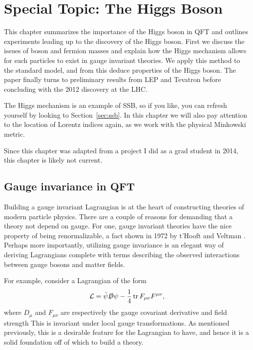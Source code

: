 \chapter{Special Topic: The Higgs Boson}\label{ap:spec_higgs}

This chapter summarizes the importance of the Higgs boson in QFT and outlines
experiments leading up to the discovery of the Higgs boson.
First we discuss the issues of boson and fermion masses and explain
how the Higgs mechanism allows for such particles to exist in gauge invariant
theories. We apply this method to the standard model, and from this deduce
properties of the Higgs boson. The paper finally turns to preliminary results 
from LEP and Tevatron before concluding with the 2012 discovery at the LHC.

The Higgs mechanism is an example of SSB, so if you like, you can refresh
yourself by looking to Section~\ref{sec:ssb}. In this chapter we will
also pay attention to the location of Lorentz indices again, as we
work with the physical Minkowski metric.

Since this chapter was adapted from a project I did as a grad student in 2014,
this chapter is likely not current.

\section{Gauge invariance in QFT}

Building a gauge invariant Lagrangian is at the heart of constructing theories
of modern particle physics. There are a couple of reasons for demanding that a
theory not depend on gauge. For one, gauge invariant theories have the nice
property of being renormalizable, a fact shown in 1972 by t'Hooft and Veltman 
\cite{t_hooft_regularization_1972}. Perhaps more importantly, utilizing gauge
invariance is an elegant way of deriving Lagrangians complete with terms
describing the observed interactions between gauge bosons and matter fields.

For example, consider a Lagrangian of the form
\begin{equation}
  \label{eq:genLagr}
  \mathcal{L}=\bar{\psi}\slashed{D}\psi-\frac{1}{4}\tr F_{\mu\nu}F^{\mu\nu} ,
\end{equation}
where $D_{\mu}$ and $F_{\mu\nu}$ are respectively the gauge covariant
derivative and field strength
This is invariant under local gauge transformations. 
As mentioned previously, this is a desirable feature for the
Lagrangian to have, and hence it is a solid foundation off of which to build
a theory.

